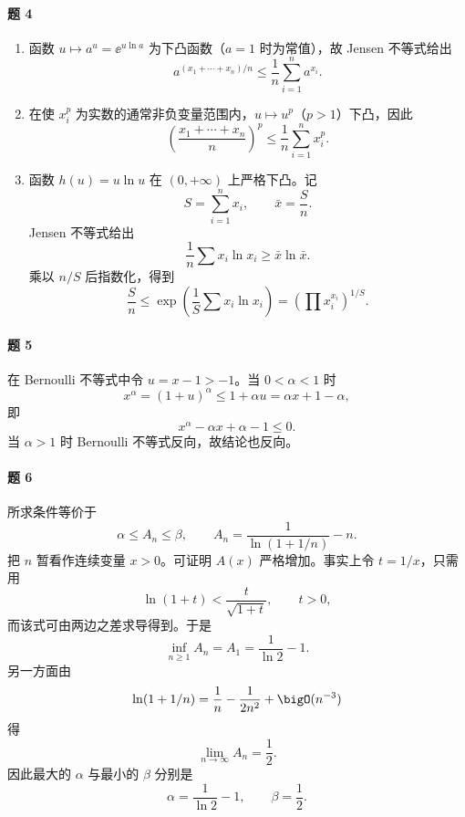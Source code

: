 \paragraph{题 4}
\begin{xsolution}
\begin{enumerate}[label=(\arabic*)]
  \item 函数 $u\mapsto a^u=\ee^{u\ln a}$ 为下凸函数（$a=1$ 时为常值），故 Jensen 不等式给出
  \[
    a^{(x_1+\cdots+x_n)/n}\le\frac1n\sum_{i=1}^n a^{x_i}.
  \]

  \item 在使 $x_i^p$ 为实数的通常非负变量范围内，$u\mapsto u^p$（$p>1$）下凸，因此
  \[
    \left(\frac{x_1+\cdots+x_n}{n}\right)^p
    \le\frac1n\sum_{i=1}^n x_i^p.
  \]

  \item 函数 $h(u)=u\ln u$ 在 $(0,+\infty)$ 上严格下凸。记
  \[
    S=\sum_{i=1}^n x_i,\qquad \bar x=\frac Sn.
  \]
  Jensen 不等式给出
  \[
    \frac1n\sum x_i\ln x_i\ge\bar x\ln\bar x.
  \]
  乘以 $n/S$ 后指数化，得到
  \[
    \frac Sn\le
    \exp\left(\frac1S\sum x_i\ln x_i\right)
    =\left(\prod x_i^{x_i}\right)^{1/S}.
  \]
\end{enumerate}
\end{xsolution}

\paragraph{题 5}
\begin{xsolution}
在 Bernoulli 不等式中令 $u=x-1>-1$。当 $0<\alpha<1$ 时
\[
  x^\alpha=(1+u)^\alpha\le1+\alpha u=\alpha x+1-\alpha,
\]
即
\[
  x^\alpha-\alpha x+\alpha-1\le0.
\]
当 $\alpha>1$ 时 Bernoulli 不等式反向，故结论也反向。
\end{xsolution}

\paragraph{题 6}
\begin{xsolution}
所求条件等价于
\[
  \alpha\le A_n\le\beta,
  \qquad
  A_n=\frac1{\ln(1+1/n)}-n.
\]
把 $n$ 暂看作连续变量 $x>0$。可证明 $A(x)$ 严格增加。事实上令 $t=1/x$，只需用
\[
  \ln(1+t)<\frac{t}{\sqrt{1+t}},\qquad t>0,
\]
而该式可由两边之差求导得到。于是
\[
  \inf_{n\ge1}A_n=A_1=\frac1{\ln2}-1.
\]
另一方面由
\[
  \ln(1+1/n)=\frac1n-\frac1{2n^2}+\bigO(n^{-3})
\]
得
\[
  \lim_{n\to\infty}A_n=\frac12.
\]
因此最大的 $\alpha$ 与最小的 $\beta$ 分别是
\[
  \boxed{\alpha=\frac1{\ln2}-1,\qquad \beta=\frac12}.
\]
\end{xsolution}

